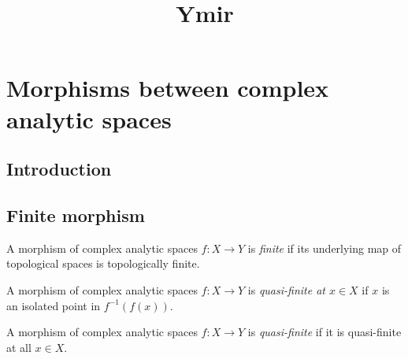 



\title{Ymir}


\chapter*{Morphisms between complex analytic spaces}\label{chap-morphismscomplex}







\maketitle


\tableofcontents



\section{Introduction}\label{sec-introduction-morphismscomplex}


\section{Finite morphism}


\begin{definition}
    A morphism of complex analytic spaces $f:X\rightarrow Y$ is \emph{finite} if its underlying map of topological spaces is topologically finite.
\end{definition}
\begin{definition}
    A morphism of complex analytic spaces $f:X\rightarrow Y$ is \emph{quasi-finite at $x\in X$} if $x$ is an isolated point in $f^{-1}(f(x))$.

    A morphism of complex analytic spaces $f:X\rightarrow Y$ is \emph{quasi-finite} if it is quasi-finite at all $x\in X$.
\end{definition}

